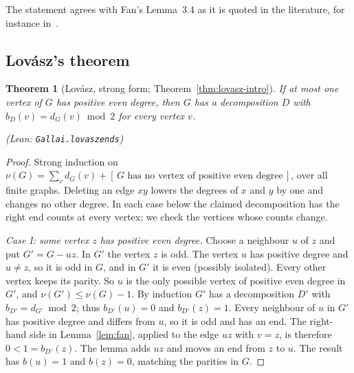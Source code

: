 \documentclass[11pt]{amsart}
\newtheorem{theorem}{Theorem}[section]
\theoremstyle{definition}
\theoremstyle{remark}
\renewcommand{\_}{\oldunderscore\allowbreak}
\newcommand{\leanst}[1]{\par{\raggedright\small\textup{(Lean: \texttt{#1})}\par}}
\newcommand{\ind}[1]{[\,#1\,]}
\begin{document}
The statement agrees with Fan's Lemma~3.4 as it is quoted in the literature, for instance
in~\cite{BS21}.

\subsection{Lov\'asz's theorem}

\begin{theorem}[Lov\'asz, strong form; Theorem~\ref{thm:lovasz-intro}]\label{thm:lovasz-strong}
If at most one vertex of $G$ has positive even degree, then $G$ has a decomposition $D$ with
$b_D(v)=d_G(v)\bmod 2$ for every vertex $v$.
\leanst{Gallai.lovasz\_ends}
\end{theorem}

\begin{proof}
Strong induction on $\nu(G)=\sum_v d_G(v)+\ind{G\text{ has no vertex of positive even degree}}$,
over all finite graphs. Deleting an edge $xy$ lowers the degrees of $x$ and $y$ by one and changes
no other degree. In each case below the claimed decomposition has the right end counts at every
vertex; we check the vertices whose counts change.

\emph{Case I: some vertex $z$ has positive even degree.} Choose a neighbour $u$ of $z$ and put
$G'=G-uz$. In $G'$ the vertex $z$ is odd. The vertex $u$ has positive degree and $u\ne z$, so it is
odd in $G$, and in $G'$ it is even (possibly isolated). Every other vertex keeps its parity. So $u$
is the only possible vertex of positive even degree in $G'$, and $\nu(G')\le\nu(G)-1$. By induction
$G'$ has a decomposition $D'$ with $b_{D'}=d_{G'}\bmod2$; thus $b_{D'}(u)=0$ and $b_{D'}(z)=1$.
Every neighbour of $u$ in $G'$ has positive degree and differs from $u$, so it is odd and has an
end. The right-hand side in Lemma~\ref{lem:fan}, applied to the edge $uz$ with $v=z$, is therefore
$0<1=b_{D'}(z)$. The lemma adds $uz$ and moves an end from $z$ to $u$. The result has $b(u)=1$ and
$b(z)=0$, matching the parities in $G$.


\end{proof}
\end{document}
